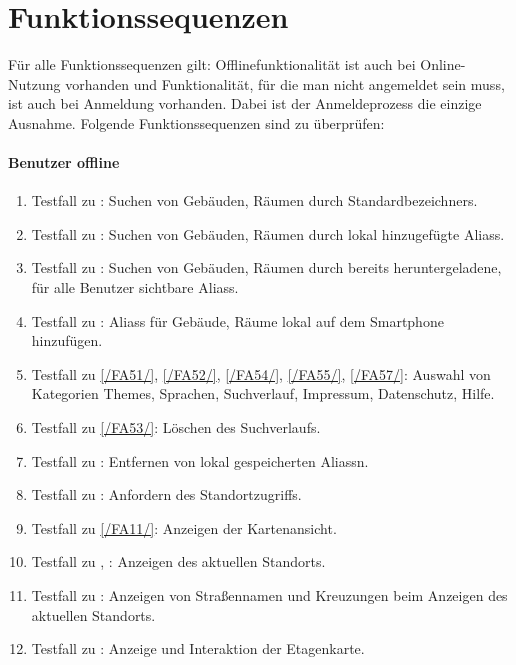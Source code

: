 \section{Funktionssequenzen}

Für alle Funktionssequenzen gilt:
Offlinefunktionalität ist auch bei Online-Nutzung vorhanden und Funktionalität, für die man nicht angemeldet sein muss, ist auch bei Anmeldung vorhanden. Dabei ist der Anmeldeprozess die einzige Ausnahme.
Folgende Funktionssequenzen sind zu überprüfen:

\paragraph{\Gls{Benutzer} offline}
\begin{enumerate}[label=\textbf{/T\arabic*0/}, align=left]
	\item \label{/T10/} Testfall zu : Suchen von Gebäuden, Räumen durch \Glspl{Standardbezeichner}.
	\item \label{/T20/} Testfall zu : Suchen von Gebäuden, Räumen durch \gls{lokal} hinzugefügte \Glspl{Alias}.
	\item \label{/T30/} Testfall zu : Suchen von Gebäuden, Räumen durch bereits heruntergeladene, für alle Benutzer sichtbare \Glspl{Alias}.
	\item \label{/T40/} Testfall zu : \Glspl{Alias} für Gebäude, Räume \gls{lokal} auf dem Smartphone hinzufügen.
	\item \label{/T50/} Testfall zu \ref{/FA51/}, \ref{/FA52/}, \ref{/FA54/}, \ref{/FA55/}, \ref{/FA57/}: Auswahl von Kategorien \Glspl{Theme}, Sprachen, Suchverlauf, Impressum, Datenschutz, Hilfe.
	\item \label{/T60/} Testfall zu \ref{/FA53/}: Löschen des Suchverlaufs.
	\item \label{/T70/} Testfall zu : Entfernen von \gls{lokal} gespeicherten \Glspl{Alias}n.
	\item \label{/T80/} Testfall zu : Anfordern des Standortzugriffs.
	\item \label{/T90/} Testfall zu \ref{/FA11/}: Anzeigen der \Gls{Kartenansicht}.
	\item \label{/T100/} Testfall zu , : Anzeigen des aktuellen Standorts.
	\item \label{/T110/} Testfall zu : Anzeigen von Straßennamen und Kreuzungen beim Anzeigen des aktuellen Standorts.
	\item \label{/T120/} Testfall zu : Anzeige und Interaktion der \Gls{Etagenkarte}.

\end{enumerate}
